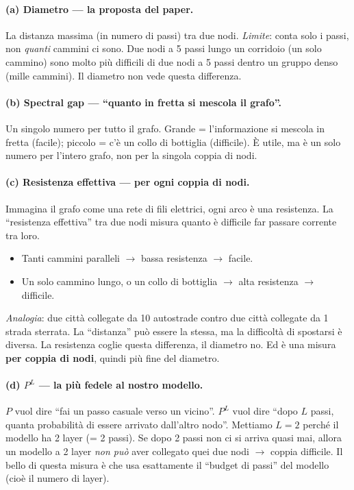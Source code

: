 \documentclass[11pt,a4paper]{article}
\begin{document}
\paragraph{(a) Diametro --- la proposta del paper.}
La distanza massima (in numero di passi) tra due nodi. \emph{Limite}: conta solo
i passi, non \emph{quanti} cammini ci sono. Due nodi a 5 passi lungo un corridoio
(un solo cammino) sono molto più difficili di due nodi a 5 passi dentro un gruppo
denso (mille cammini). Il diametro non vede questa differenza.

\paragraph{(b) Spectral gap --- ``quanto in fretta si mescola il grafo''.}
Un singolo numero per tutto il grafo. Grande = l'informazione si mescola in fretta
(facile); piccolo = c'è un collo di bottiglia (difficile). È utile, ma è un solo
numero per l'intero grafo, non per la singola coppia di nodi.

\paragraph{(c) Resistenza effettiva --- per ogni coppia di nodi.}
Immagina il grafo come una rete di fili elettrici, ogni arco è una resistenza.
La ``resistenza effettiva'' tra due nodi misura quanto è difficile far passare
corrente tra loro.
\begin{itemize}
  \item Tanti cammini paralleli $\rightarrow$ bassa resistenza $\rightarrow$ facile.
  \item Un solo cammino lungo, o un collo di bottiglia $\rightarrow$ alta
        resistenza $\rightarrow$ difficile.
\end{itemize}
\emph{Analogia}: due città collegate da 10 autostrade contro due città collegate
da 1 strada sterrata. La ``distanza'' può essere la stessa, ma la difficoltà di
spostarsi è diversa. La resistenza coglie questa differenza, il diametro no. Ed è
una misura \textbf{per coppia di nodi}, quindi più fine del diametro.

\paragraph{(d) $P^L$ --- la più fedele al nostro modello.}
$P$ vuol dire ``fai un passo casuale verso un vicino''. $P^L$ vuol dire ``dopo
$L$ passi, quanta probabilità di essere arrivato dall'altro nodo''. Mettiamo
$L = 2$ perché il modello ha 2 layer (= 2 passi). Se dopo 2 passi non ci si
arriva quasi mai, allora un modello a 2 layer \emph{non può} aver collegato quei
due nodi $\rightarrow$ coppia difficile. Il bello di questa misura è che usa
esattamente il ``budget di passi'' del modello (cioè il numero di layer).
\end{document}
